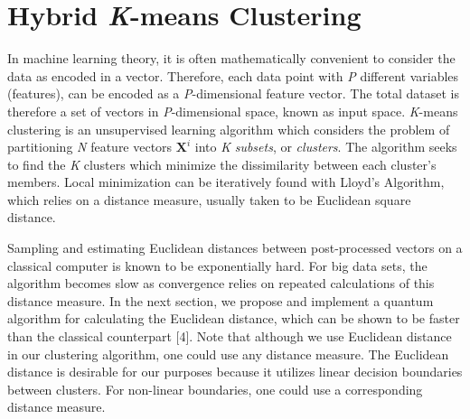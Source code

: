 \documentclass[twocolumn, english]{revtex4-2}
\begin{document}
\section{Hybrid \textit{K}-means Clustering}

In machine learning theory, it is often mathematically convenient to consider the data as encoded in a vector. Therefore, each data point with \textit{P} different variables (features), can be encoded as a \textit{P}-dimensional feature vector. The total dataset is therefore a set of vectors in \textit{P}-dimensional space, known as input space. \textit{K}-means clustering is an unsupervised learning algorithm which considers the problem of partitioning \textit{N} feature vectors $\textbf{X}^{i}$ into \textit{K} \textit{subsets}, or \textit{clusters}. The algorithm seeks to find the \textit{K} clusters which minimize the dissimilarity between each cluster's members. Local minimization can be iteratively found with Lloyd's Algorithm, which relies on a distance measure, usually taken to be Euclidean square distance. 

Sampling and estimating Euclidean distances between post-processed vectors on a classical computer is known to be exponentially hard. For big data sets, the algorithm becomes slow as convergence relies on repeated calculations of this distance measure. In the next section, we propose and implement a quantum algorithm for calculating the Euclidean distance, which can be shown to be faster than the classical counterpart [4]. Note that although we use Euclidean distance in our clustering algorithm, one could use any distance measure. The Euclidean distance is desirable for our purposes because it utilizes linear decision boundaries between clusters. For non-linear boundaries, one could use a corresponding distance measure. 
\end{document}
